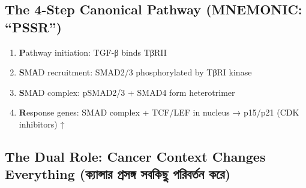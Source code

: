 \hypertarget{the-4-step-canonical-pathway-mnemonic-pssr}{%
\subsection{\texorpdfstring{\textbf{The 4-Step Canonical Pathway}
(MNEMONIC:
``PSSR'')}{The 4-Step Canonical Pathway (MNEMONIC: ``PSSR'')}}\label{the-4-step-canonical-pathway-mnemonic-pssr}}

\begin{enumerate}
\def\labelenumi{\arabic{enumi}.}
\tightlist
\item
  \textbf{P}athway initiation: TGF-β binds TβRII
\item
  \textbf{S}MАD recruitment: SMAD2/3 phosphorylated by TβRI kinase
\item
  \textbf{S}MАD complex: pSMAD2/3 + SMAD4 form heterotrimer
\item
  \textbf{R}esponse genes: SMAD complex + TCF/LEF in nucleus → p15/p21
  (CDK inhibitors) ↑
\end{enumerate}

\begin{Shaded}
\begin{Highlighting}[]
\end{Highlighting}
\end{Shaded}

\hypertarget{the-dual-role-cancer-context-changes-everything-ux995ux9afux9a8ux9b8ux9b0-ux9aaux9b0ux9b8ux999ux997-ux9b8ux9acux995ux99b-ux9aaux9b0ux9acux9b0ux9a4ux9a8-ux995ux9b0}{%
\subsection{\texorpdfstring{\textbf{The Dual Role: Cancer Context
Changes Everything} (ক্যান্সার প্রসঙ্গ সবকিছু পরিবর্তন
করে)}{The Dual Role: Cancer Context Changes Everything (ক্যান্সার প্রসঙ্গ সবকিছু পরিবর্তন করে)}}\label{the-dual-role-cancer-context-changes-everything-ux995ux9afux9a8ux9b8ux9b0-ux9aaux9b0ux9b8ux999ux997-ux9b8ux9acux995ux99b-ux9aaux9b0ux9acux9b0ux9a4ux9a8-ux995ux9b0}}


